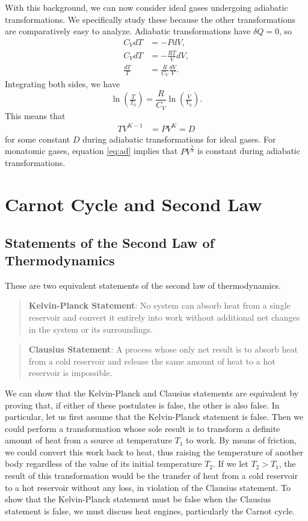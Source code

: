 With this background, we can now consider ideal gases undergoing adiabatic transformations. We specifically study these because the other transformations are comparatively easy to analyze. Adiabatic transformations have $\delta Q = 0$, so \begin{align*} C_V dT &= -P dV, \\ C_V dT &= - \frac{RT}{V} dV, \\ \frac{dT}{T} &= \frac{R}{C_V} \frac{dV}{V} .\end{align*} Integrating both sides, we have $$\ln \left(\tfrac{T}{T_0} \right) = \frac{R}{C_V} \ln \left(\tfrac{V}{V_0} \right).$$ This means that \begin{align} TV^{K-1} &= PV^K = D \label{eq:ad}\end{align}for some constant $D$ during adiabatic transformations for ideal gases. For monatomic gases, equation \ref{eq:ad} implies that $PV^{\tfrac{5}{3}}$ is constant during adiabatic transformations. 
\section {Carnot Cycle and Second Law}
\subsection{Statements of the Second Law of Thermodynamics}
These are two equivalent statements of the second law of thermodynamics.
\begin{quote}
\textbf{Kelvin-Planck Statement}: No system can absorb heat from a single reservoir and convert it entirely into work without additional net changes in the system or its surroundings.
\end{quote}
\begin{quote}
 \textbf{Clausius Statement}: A process whose only net result is to absorb heat from a cold reservoir and release the same amount of heat to a hot reservoir is impossible.
\end{quote}
 
We can show that the Kelvin-Planck and Clausius statements are equivalent by proving that, if either of these postulates is false, the other is also false. In particular, let us first assume that the Kelvin-Planck statement is false. Then we could perform a transformation whose sole result is to transform a definite amount of heat from a source at temperature $T_1$ to work. By means of friction, we could convert this work back to heat, thus raising the temperature of another body regardless of the value of its initial temperature $T_2$. If we let $T_2 > T_1$, the result of this transformation would be the transfer of heat from a cold reservoir to a hot reservoir without any loss, in violation of the Clausius statement. To show that the Kelvin-Planck statement must be false when the Clausius statement is false, we must discuss heat engines, particularly the Carnot cycle. 
